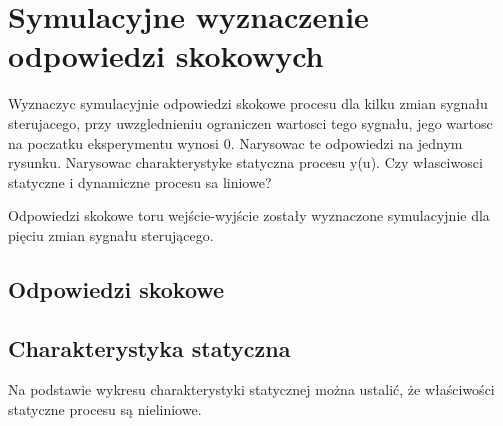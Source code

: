 \section{Symulacyjne wyznaczenie odpowiedzi skokowych}
\label{projekt:zad2}

Wyznaczyc symulacyjnie odpowiedzi skokowe procesu dla kilku zmian sygnału sterujacego,
przy uwzglednieniu ograniczen wartosci tego sygnału, jego wartosc na poczatku
eksperymentu wynosi 0. Narysowac te odpowiedzi na jednym rysunku. Narysowac charakterystyke
statyczna procesu y(u). Czy własciwosci statyczne i dynamiczne procesu
sa liniowe?

Odpowiedzi skokowe toru wejście-wyjście zostały wyznaczone
symulacyjnie dla pięciu zmian sygnału sterującego.

\subsection{Odpowiedzi skokowe}
\label{projekt:zad2:odpSkok}

%     

\newpage

\subsection{Charakterystyka statyczna}
\label{projekt:zad2:charStat}

Na podstawie wykresu charakterystyki statycznej można ustalić, że właściwości
statyczne procesu są nieliniowe. \newline

\newpage

